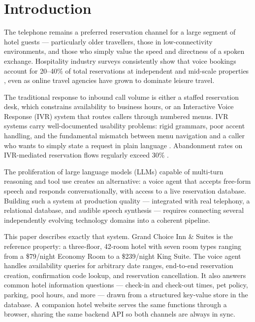 \documentclass[conference]{IEEEtran}
\begin{document}
\section{Introduction}

The telephone remains a preferred reservation channel for a large segment of
hotel guests — particularly older travellers, those in low-connectivity
environments, and those who simply value the speed and directness of a spoken
exchange. Hospitality industry surveys consistently show that voice bookings
account for 20–40\% of total reservations at independent and mid-scale
properties \cite{amadeus2023}, even as online travel agencies have grown to
dominate leisure travel.

The traditional response to inbound call volume is either a staffed reservation
desk, which constrains availability to business hours, or an Interactive Voice
Response (IVR) system that routes callers through numbered menus. IVR systems
carry well-documented usability problems: rigid grammars, poor accent handling,
and the fundamental mismatch between menu navigation and a caller who wants to
simply state a request in plain language \cite{levin2018ivr}. Abandonment rates
on IVR-mediated reservation flows regularly exceed 30\% \cite{nuance2021}.

The proliferation of large language models (LLMs) capable of multi-turn
reasoning and tool use creates an alternative: a voice agent that accepts
free-form speech and responds conversationally, with access to a live
reservation database. Building such a system at production quality — integrated
with real telephony, a relational database, and audible speech synthesis —
requires connecting several independently evolving technology domains into a
coherent pipeline.

This paper describes exactly that system. Grand Choice Inn \& Suites is the
reference property: a three-floor, 42-room hotel with seven room types ranging
from a \$79/night Economy Room to a \$239/night King Suite. The voice agent
handles availability queries for arbitrary date ranges, end-to-end reservation
creation, confirmation code lookup, and reservation cancellation. It also
answers common hotel information questions — check-in and check-out times,
pet policy, parking, pool hours, and more — drawn from a structured key-value
store in the database. A companion hotel website serves the same functions
through a browser, sharing the same backend API so both channels are always
in sync.
\end{document}

